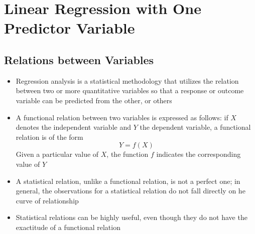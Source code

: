 
\section{Linear Regression with One Predictor Variable}
\subsection{Relations between Variables}
\begin{itemize}
\item Regression analysis is a statistical methodology that utilizes the relation between two or more quantitative variables so that a response or outcome variable can be predicted from the other, or others 
\item A functional relation between two variables is expressed as follows: if $X$ denotes the independent variable and $Y$ the dependent variable, a functional relation is of the form $$Y = f(X) $$ Given a particular value of $X$, the function $f$ indicates the corresponding value of $Y$ 
\item A statistical relation, unlike a functional relation, is not a perfect one; in general, the observations for a statistical relation do not fall directly on he curve of relationship
\item Statistical relations can be highly useful, even though they do not have the exactitude of a functional relation
\end{itemize}

